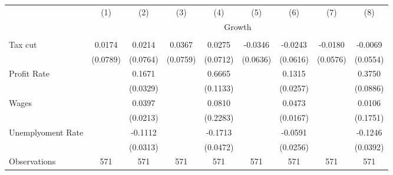\begin{tabular}{lcccccccc} \\ \hline 
                    &\multicolumn{1}{c}{(1)}         &\multicolumn{1}{c}{(2)}         &\multicolumn{1}{c}{(3)}         &\multicolumn{1}{c}{(4)}         &\multicolumn{1}{c}{(5)}         &\multicolumn{1}{c}{(6)}         &\multicolumn{1}{c}{(7)}         &\multicolumn{1}{c}{(8)}         \\
& \multicolumn{8}{c}{Growth} \\ \hline &  &  &  &  &  &  &  &  &  \\
Tax cut             &      0.0174         &      0.0214         &      0.0367         &      0.0275         &     -0.0346         &     -0.0243         &     -0.0180         &     -0.0069         \\
                    &    (0.0789)         &    (0.0764)         &    (0.0759)         &    (0.0712)         &    (0.0636)         &    (0.0616)         &    (0.0576)         &    (0.0554)         \\
\addlinespace
Profit Rate         &                     &      0.1671\sym{***}&                     &      0.6665\sym{***}&                     &      0.1315\sym{***}&                     &      0.3750\sym{***}\\
                    &                     &    (0.0329)         &                     &    (0.1133)         &                     &    (0.0257)         &                     &    (0.0886)         \\
\addlinespace
Wages               &                     &      0.0397\sym{*}  &                     &      0.0810         &                     &      0.0473\sym{***}&                     &      0.0106         \\
                    &                     &    (0.0213)         &                     &    (0.2283)         &                     &    (0.0167)         &                     &    (0.1751)         \\
\addlinespace
Unemplyoment Rate   &                     &     -0.1112\sym{***}&                     &     -0.1713\sym{***}&                     &     -0.0591\sym{**} &                     &     -0.1246\sym{***}\\
                    &                     &    (0.0313)         &                     &    (0.0472)         &                     &    (0.0256)         &                     &    (0.0392)         \\
\arrayrulecolor{black!10}\midrule
Observations        &         571         &         571         &         571         &         571         &         571         &         571         &         571         &         571         \\

\end{tabular}
